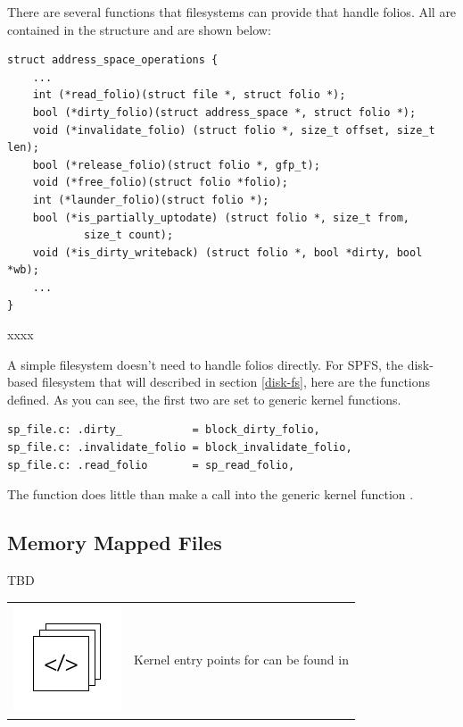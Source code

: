 There are several functions that filesystems can provide that handle folios. All are contained in the  structure and are shown below:

\begin{lstlisting}
struct address_space_operations {
    ...
    int (*read_folio)(struct file *, struct folio *);
    bool (*dirty_folio)(struct address_space *, struct folio *);
    void (*invalidate_folio) (struct folio *, size_t offset, size_t len);
    bool (*release_folio)(struct folio *, gfp_t);
    void (*free_folio)(struct folio *folio);
    int (*launder_folio)(struct folio *);
    bool (*is_partially_uptodate) (struct folio *, size_t from,
            size_t count);
    void (*is_dirty_writeback) (struct folio *, bool *dirty, bool *wb);
    ...
}
\end{lstlisting}

\noindent
xxxx

A simple filesystem doesn't need to handle folios directly. For SPFS, the disk-based filesystem that will described in section \ref{disk-fs}, here are the functions defined. As you can see, the first two are set to generic kernel functions.

\begin{lstlisting}
sp_file.c: .dirty_           = block_dirty_folio,
sp_file.c: .invalidate_folio = block_invalidate_folio,
sp_file.c: .read_folio       = sp_read_folio,
\end{lstlisting}

\noindent
The  function does little than make a call into the generic kernel function .


\subsection{Memory Mapped Files}

TBD

\begin{table}[h]
\begin{tabular}{ll}
\parbox[l]{0.6in}{\includegraphics[scale=0.8]{figures/src-xref.pdf}} & \parbox[l]{4in}{\small{Kernel entry points for  can be found in }}
\end{tabular}
\end{table}

